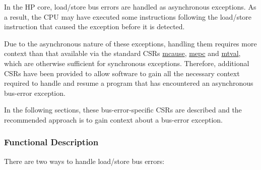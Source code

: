 \documentclass[main\_\_EN.tex]{subfiles}
\begin{document}
In the HP core, load/store bus errors are handled as asynchronous exceptions. As a result, the CPU may have executed some instructions following the load/store instruction that caused the exception before it is detected.

Due to the asynchronous nature of these exceptions, handling them requires more context than that available via the standard CSRs \hyperref[regdesc:MCAUSE]{mcause}, \hyperref[regdesc:MEPC]{mepc} and \hyperref[regdesc:MTVAL]{mtval}, which are otherwise sufficient for synchronous exceptions. Therefore, additional CSRs have been provided to allow software to gain all the necessary context required to handle and resume a program that has encountered an asynchronous bus-error exception.

In the following sections, these bus-error-specific CSRs are described and the recommended approach is to gain context about a bus-error exception.

\subsubsection{Functional Description}
\label{sec:riscvcpu-buserr-func-descr}

There are two ways to handle load/store bus errors:
\end{document}
